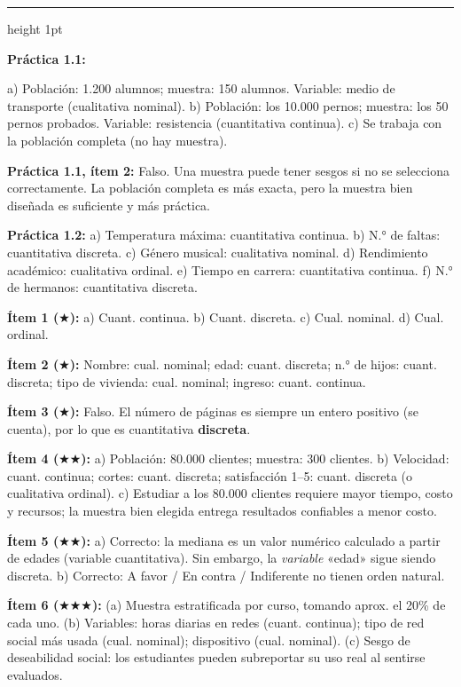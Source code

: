 \documentclass[11pt, letterpaper]{article}
\newcommand{\subbloque}[1]{%
  \vspace{14pt}
  \noindent{\large\bfseries\color{zenitnavy} #1}\par
  \vspace{4pt}\hrule height 1pt\vspace{8pt}}
\begin{document}
\subbloque{Sección 1 --- Conceptos fundamentales}

\textbf{Práctica 1.1:}

a) Población: 1.200 alumnos; muestra: 150 alumnos. Variable: medio de transporte (cualitativa nominal).
b) Población: los 10.000 pernos; muestra: los 50 pernos probados. Variable: resistencia (cuantitativa continua).
c) Se trabaja con la población completa (no hay muestra).

\textbf{Práctica 1.1, ítem 2:} Falso. Una muestra puede tener sesgos si no se selecciona correctamente. La población completa es más exacta, pero la muestra bien diseñada es suficiente y más práctica.

\textbf{Práctica 1.2:}
a) Temperatura máxima: cuantitativa continua.
b) N.° de faltas: cuantitativa discreta.
c) Género musical: cualitativa nominal.
d) Rendimiento académico: cualitativa ordinal.
e) Tiempo en carrera: cuantitativa continua.
f) N.° de hermanos: cuantitativa discreta.

\textbf{Ítem 1 ($\bigstar$):}
a) Cuant. continua. \; b) Cuant. discreta. \; c) Cual. nominal. \; d) Cual. ordinal.

\textbf{Ítem 2 ($\bigstar$):}
Nombre: cual. nominal; edad: cuant. discreta; n.° de hijos: cuant. discreta; tipo de vivienda: cual. nominal; ingreso: cuant. continua.

\textbf{Ítem 3 ($\bigstar$):}
Falso. El número de páginas es siempre un entero positivo (se cuenta), por lo que es cuantitativa \textbf{discreta}.

\textbf{Ítem 4 ($\bigstar\bigstar$):}
a) Población: 80.000 clientes; muestra: 300 clientes.
b) Velocidad: cuant. continua; cortes: cuant. discreta; satisfacción 1–5: cuant. discreta (o cualitativa ordinal).
c) Estudiar a los 80.000 clientes requiere mayor tiempo, costo y recursos; la muestra bien elegida entrega resultados confiables a menor costo.

\textbf{Ítem 5 ($\bigstar\bigstar$):}
a) Correcto: la mediana es un valor numérico calculado a partir de edades (variable cuantitativa). Sin embargo, la \textit{variable} «edad» sigue siendo discreta.
b) Correcto: A favor / En contra / Indiferente no tienen orden natural.

\textbf{Ítem 6 ($\bigstar\bigstar\bigstar$):}
(a) Muestra estratificada por curso, tomando aprox. el 20\% de cada uno.
(b) Variables: horas diarias en redes (cuant. continua); tipo de red social más usada (cual. nominal); dispositivo (cual. nominal).
(c) Sesgo de deseabilidad social: los estudiantes pueden subreportar su uso real al sentirse evaluados.
\end{document}
